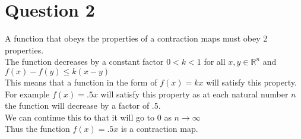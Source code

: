 \documentclass{article}
\begin{document}
\section*{Question 2}
A function that obeys the properties of a contraction maps must obey 2 properties.\\
The function decreases by a constant factor $0 < k < 1$ for all $x,y \in \mathbb{R}^n$ and $f(x) - f(y) \leq k(x-y)$\\
This means that a function in the form of $f(x) = kx$ will satisfy this property.\\
For example $f(x) = .5x$ will satisfy this property as at each natural number $n$ the function will decrease by a factor of .5.\\
We can continue this to that it will go to 0 as $n \to \infty$\\
Thus the function $f(x) = .5x$ is a contraction map.
\end{document}
